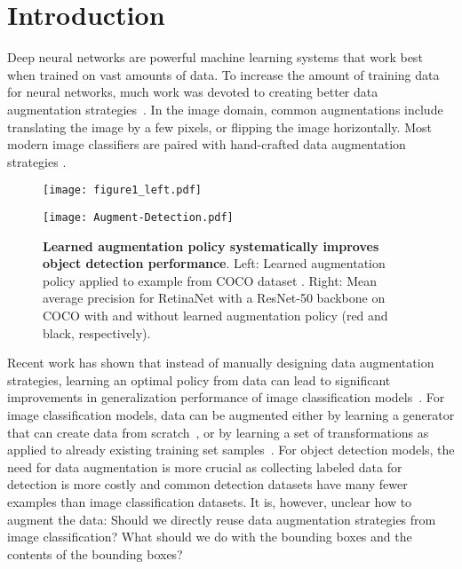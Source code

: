 \documentclass[10pt,twocolumn,letterpaper]{article}
\begin{document}
 \section{Introduction}
Deep neural networks are powerful machine learning systems that work best when trained on vast amounts of data.  To increase the amount of training data for neural networks, much work was devoted to creating better data augmentation strategies~\cite{baird1992document,simard2003best,krizhevsky2012imagenet}. In the image domain, common augmentations include translating the image by a few pixels, or flipping the image horizontally. Most modern image classifiers are paired with hand-crafted data augmentation strategies \cite{krizhevsky2012imagenet,szegedy2015going,he2016deep,hu2017squeeze,zoph2017learning}. 

\begin{figure}[t]
\centering
\begin{minipage}[c]{0.35\linewidth}
\texttt{[image: figure1\_left.pdf]}
\end{minipage}\begin{minipage}[c]{0.65\linewidth}
\vspace{12pt}
\texttt{[image: Augment-Detection.pdf]}
\end{minipage}\caption{\textbf{Learned augmentation policy systematically improves object detection performance}. Left: Learned augmentation policy applied to example from COCO dataset \cite{lin2014microsoft}. Right: Mean average precision for RetinaNet \cite{lin2017focal} with a ResNet-50 backbone on COCO \cite{lin2014microsoft} with and without learned augmentation policy (red and black, respectively). }

\label{fig:marketing}
\end{figure}
 
Recent work has shown that instead of manually designing data augmentation strategies, learning an optimal policy from data can lead to significant improvements in generalization performance of image classification models~\cite{lemley2017smart, tran2017bayesian, devries2017dataset,perez2017effectiveness,mun2017generative,zhu2017data,antoniou2017data,sixt2016rendergan, ratner2017learning,cubuk2018autoaugment}. For image classification models, data can be augmented either by learning a generator that can create data from scratch~\cite{perez2017effectiveness,mun2017generative,zhu2017data,antoniou2017data,sixt2016rendergan}, or by learning a set of transformations as applied to already existing training set samples~\cite{cubuk2018autoaugment,ratner2017learning}. For object detection models, the need for data augmentation is more crucial as collecting labeled data for detection is more costly and common detection datasets have many fewer examples than image classification datasets. It is, however, unclear how to augment the data: Should we directly reuse data augmentation strategies from image classification? What should we do with the bounding boxes and the contents of the bounding boxes? 
\end{document}
